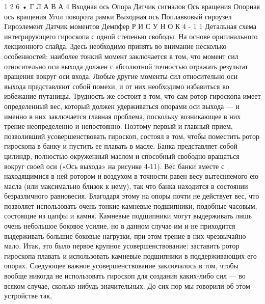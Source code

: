 \documentclass[10pt,oneside]{article}
\begin{document}
1 2 6 • Г Л А В А  4 Входная ось Опора Датчик сигналов Ось вращения Опорная ось вращения Угол поворота рамки Выходная ось Поплавковый гироузел Гироэлемент Датчик моментов Демпфер Р И С У Н О К  4 - 1 1 Детальная схема интегрирующего гироскопа с одной степенью свободы. На основе оригинального лекционного слайда. Здесь необходимо принять во внимание несколько особенностей: наиболее тонкий момент заключается в том, что момент сил относительно оси выхода должен с абсолютной точностью отражать результат вращения вокруг оси входа. Любые другие моменты сил относительно оси выхода представляют собой помехи, и от них необходимо избавиться во избежание путаницы. Трудность же состоит в том, что сам ротор гироскопа имеет определенный вес, который должен удерживаться опорами оси выхода --- и именно в них заключается главная проблема, поскольку возникающее в них трение неопределенно и непостоянно. Поэтому первый и главный прием, позволивший усовершенствовать гироскоп, состоял в том, чтобы поместить ротор гироскопа в банку и пустить ее плавать в масле. Банка представляет собой цилиндр, полностью окруженный маслом и способный свободно вращаться вокруг своей оси («Ось выхода» на рисунке 4-11). Вес банки вместе с находящимися в ней ротором и воздухом в точности равен весу вытесняемого ею масла (или максимально близок к нему), так что банка находится в состоянии безразличного равновесия. Благодаря этому на опоры почти не действует вес, что позволяет использовать очень тонкие камневые подшипники, подобные часовым, состоящие из цапфы и камня. Камневые подшипники могут выдерживать лишь очень небольшое боковое усилие, но в данном случае им и не приходится выдерживать большие боковые нагрузки, при этом трение в них чрезвычайно мало. Итак, это было первое крупное усовершенствование: заставить ротор гироскопа плавать и использовать камневые подшипники в поддерживающих его опорах. Следующее важное усовершенствование заключалось в том, чтобы вообще никогда не использовать гироскоп для создания каких-либо сил --- во всяком случае, сколько-нибудь значительных. До сих пор мы говорили об этом устройстве так,\par
\end{document}
